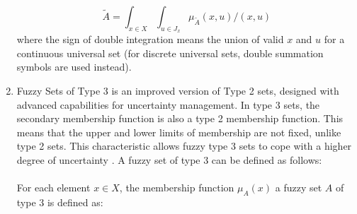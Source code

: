 \documentclass{article}
\begin{document}
\begin{minipage}{0.49\textwidth}
\begin{enumerate}
            $$\tilde{A}=\int_{x\in X}\int_{u\in J_{x}} \mu_{\tilde{A}}(x,u) / (x,u)$$
            where the sign of double integration means the union of valid $x$ and $u$ for a continuous universal set (for discrete universal sets, double summation symbols are used instead).
            \item Fuzzy Sets of Type 3 is an improved version of Type 2 sets, designed with advanced capabilities for uncertainty management. In type 3 sets, the secondary membership function is also a type 2 membership function. This means that the upper and lower limits of membership are not fixed, unlike type 2 sets. This characteristic allows fuzzy type 3 sets to cope with a higher degree of uncertainty \cite{litlink22}. A fuzzy set of type 3 can be defined as follows:\\
            ~\\
            For each element \(x \in X\), the membership function \(\mu_{A}(x)\) a fuzzy set \(A\) of type 3 is defined as:\\
        \end{enumerate}
        ~\\
        ~\\
        ~\\
        ~\\
        ~\\
        ~\\
        ~\\
        ~\\
        ~\\
        ~\\
        ~\\
        ~\\
        ~\\
        ~\\
        ~\\
        ~\\
        ~\\
        ~\\
        ~\\
        ~\\
        ~\\
        ~\\
        ~\\
        ~\\
        ~\\
        ~\\
        ~\\
        ~\\
        ~\\
        ~\\
        ~\\
        ~\\
        ~\\
        ~\\
        ~\\
        \end{minipage}
\end{document}

